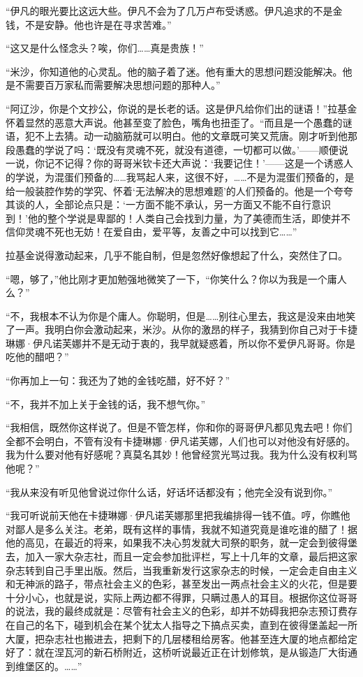 \par “伊凡的眼光要比这远大些。伊凡不会为了几万卢布受诱惑。伊凡追求的不是金钱，不是安静。他也许是在寻求苦难。”
\par “这又是什么怪念头？唉，你们……真是贵族！”
\par “米沙，你知道他的心灵乱。他的脑子着了迷。他有重大的思想问题没能解决。他是不需要百万家私而需要解决思想问题的那种人。”
\par “阿辽沙，你是个文抄公，你说的是长老的话。这是伊凡给你们出的谜语！”拉基金怀着显然的恶意大声说。他甚至变了脸色，嘴角也扭歪了。“而且是一个愚蠢的谜语，犯不上去猜。动一动脑筋就可以明白。他的文章既可笑又荒唐。刚才听到他那段愚蠢的学说了吗：‘既没有灵魂不死，就没有道德，一切都可以做。’——顺便说一说，你记不记得？你的哥哥米钦卡还大声说：‘我要记住！’——这是一个诱惑人的学说，为混蛋们预备的……我骂起人来，这很不好，……不是为混蛋们预备的，是给一般装腔作势的学究、怀着‘无法解决的思想难题’的人们预备的。他是一个夸夸其谈的人，全部论点只是：‘一方面不能不承认，另一方面又不能不自行意识到！’他的整个学说是卑鄙的！人类自己会找到力量，为了美德而生活，即使并不信仰灵魂不死也无妨！在爱自由，爱平等，友善之中可以找到它……”
\par 拉基金说得激动起来，几乎不能自制，但是忽然好像想起了什么，突然住了口。
\par “嗯，够了，”他比刚才更加勉强地微笑了一下，“你笑什么？你以为我是一个庸人么？”
\par “不，我根本不认为你是个庸人。你聪明，但是……别往心里去，我这是没来由地笑了一声。我明白你会激动起来，米沙。从你的激昂的样子，我猜到你自己对于卡捷琳娜·伊凡诺芙娜并不是无动于衷的，我早就疑惑着，所以你不爱伊凡哥哥。你是吃他的醋吧？”
\par “你再加上一句：我还为了她的金钱吃醋，好不好？”
\par “不，我并不加上关于金钱的话，我不想气你。”
\par “我相信，既然你这样说了。但是不管怎样，你和你的哥哥伊凡都见鬼去吧！你们全都不会明白，不管有没有卡捷琳娜·伊凡诺芙娜，人们也可以对他没有好感的。我为什么要对他有好感呢？真莫名其妙！他曾经赏光骂过我。我为什么没有权利骂他呢？”
\par “我从来没有听见他曾说过你什么话，好话坏话都没有；他完全没有说到你。”
\par “我可听说前天他在卡捷琳娜·伊凡诺芙娜那里把我编排得一钱不值。哼，你瞧他对鄙人是多么关注。老弟，既有这样的事情，我就不知道究竟是谁吃谁的醋了！据他的高见，在最近的将来，如果我不决心剪发就大司祭的职务，就一定会到彼得堡去，加入一家大杂志社，而且一定会参加批评栏，写上十几年的文章，最后把这家杂志转到自己手里出版。然后，当我重新发行这家杂志的时候，一定会走自由主义和无神派的路子，带点社会主义的色彩，甚至发出一两点社会主义的火花，但是要十分小心，也就是说，实际上两边都不得罪，只瞒过愚人的耳目。根据你这位哥哥的说法，我的最终成就是：尽管有社会主义的色彩，却并不妨碍我把杂志预订费存在自己的名下，碰到机会在某个犹太人指导之下搞点买卖，直到在彼得堡盖起一所大厦，把杂志社也搬进去，把剩下的几层楼租给房客。他甚至连大厦的地点都给定好了：就在涅瓦河的新石桥附近，这桥听说最近正在计划修筑，是从锻造厂大街通到维堡区的。……”
